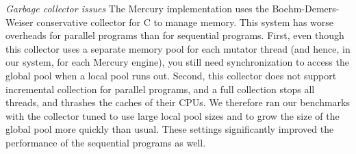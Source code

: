 
\emph{Garbage collector issues}
The Mercury implementation uses the Boehm-Demers-Weiser
conservative collector for C  to manage memory.
This system has worse overheads
for parallel programs than for sequential programs.
First, even though this collector uses
a separate memory pool for each mutator thread
(and hence, in our system, for each Mercury engine),
you still need synchronization to access the global pool
when a local pool runs out.
Second, this collector
does not support incremental collection for parallel programs,
and a full collection stops all threads,
and thrashes the caches of their CPUs.
We therefore ran our benchmarks with the collector tuned
to use large local pool sizes
and to grow the size of the global pool more quickly than usual.
These settings significantly improved
the performance of the sequential programs as well.


